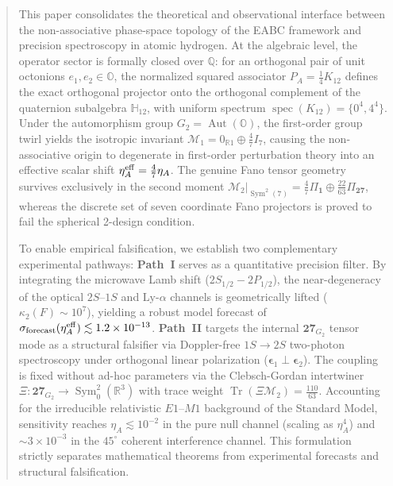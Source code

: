 \documentclass[11pt,a4paper]{article}
\begin{document}
\begin{abstract}
\noindent
This paper consolidates the theoretical and observational interface between the non-associative phase-space topology of the EABC framework and precision spectroscopy in atomic hydrogen. At the algebraic level, the operator sector is formally closed over $\mathbb{Q}$: for an orthogonal pair of unit octonions $e_1, e_2 \in \mathbb{O}$, the normalized squared associator $P_A = \frac{1}{4}K_{12}$ defines the exact orthogonal projector onto the orthogonal complement of the quaternion subalgebra $\mathbb{H}_{12}$, with uniform spectrum $\operatorname{spec}(K_{12}) = \{0^4, 4^4\}$. Under the automorphism group $G_2 = \operatorname{Aut}(\mathbb{O})$, the first-order group twirl yields the isotropic invariant $\mathcal{M}_1 = 0_{\mathbb{R}1} \oplus \frac{4}{7}I_7$, causing the non-associative origin to degenerate in first-order perturbation theory into an effective scalar shift $\eta_A^{\rm eff} = \frac{4}{7}\eta_A$. The genuine Fano tensor geometry survives exclusively in the second moment $\left.\mathcal{M}_2\right|_{\operatorname{Sym}^2(7)} = \frac{4}{7}\Pi_{\mathbf{1}} \oplus \frac{22}{63}\Pi_{\mathbf{27}}$, whereas the discrete set of seven coordinate Fano projectors is proved to fail the spherical 2-design condition.

To enable empirical falsification, we establish two complementary experimental pathways: \textbf{Path~I} serves as a quantitative precision filter. By integrating the microwave Lamb shift ($2S_{1/2} - 2P_{1/2}$), the near-degeneracy of the optical $2S\text{--}1S$ and $\text{Ly-}\alpha$ channels is geometrically lifted ($\kappa_2(F) \sim 10^7$), yielding a robust model forecast of $\sigma_{\rm forecast}(\eta_A^{\rm eff}) \lesssim 1.2 \times 10^{-13}$. \textbf{Path~II} targets the internal $\mathbf{27}_{G_2}$ tensor mode as a structural falsifier via Doppler-free $1S \to 2S$ two-photon spectroscopy under orthogonal linear polarization ($\boldsymbol{\epsilon}_1 \perp \boldsymbol{\epsilon}_2$). The coupling is fixed without ad-hoc parameters via the Clebsch-Gordan intertwiner $\Xi : \mathbf{27}_{G_2} \to \operatorname{Sym}_0^2(\mathbb{R}^3)$ with trace weight $\operatorname{Tr}(\Xi \mathcal{M}_2) = \frac{110}{63}$. Accounting for the irreducible relativistic $E1\text{--}M1$ background of the Standard Model, sensitivity reaches $\eta_A \lesssim 10^{-2}$ in the pure null channel (scaling as $\eta_A^4$) and $\sim 3 \times 10^{-3}$ in the $45^\circ$ coherent interference channel. This formulation strictly separates mathematical theorems from experimental forecasts and structural falsification.
\end{abstract}
\end{document}
